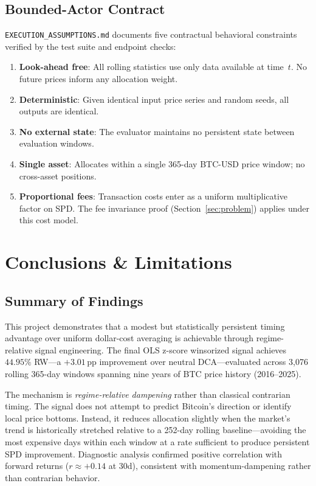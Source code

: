 \documentclass[11pt,letterpaper]{article}
\begin{document}
\subsection{Bounded-Actor Contract}

\texttt{EXECUTION\_ASSUMPTIONS.md} documents five contractual behavioral
constraints verified by the test suite and endpoint checks:

\begin{enumerate}
  \item \textbf{Look-ahead free}: All rolling statistics use only data
    available at time~$t$.  No future prices inform any allocation weight.
  \item \textbf{Deterministic}: Given identical input price series and random
    seeds, all outputs are identical.
  \item \textbf{No external state}: The evaluator maintains no persistent state
    between evaluation windows.
  \item \textbf{Single asset}: Allocates within a single 365-day BTC-USD price
    window; no cross-asset positions.
  \item \textbf{Proportional fees}: Transaction costs enter as a uniform
    multiplicative factor on SPD.  The fee invariance proof
    (Section~\ref{sec:problem}) applies under this cost model.
\end{enumerate}

\section{Conclusions \& Limitations}

\subsection{Summary of Findings}

This project demonstrates that a modest but statistically persistent timing
advantage over uniform dollar-cost averaging is achievable through regime-relative
signal engineering.  The final OLS z-score winsorized signal achieves
$\mathbf{44.95\%}$ RW---a $+3.01$\,pp improvement over neutral DCA---evaluated
across 3,076 rolling 365-day windows spanning nine years of BTC price history
(2016--2025).

The mechanism is \emph{regime-relative dampening} rather than classical
contrarian timing.  The signal does not attempt to predict Bitcoin's direction or
identify local price bottoms.  Instead, it reduces allocation slightly when the
market's trend is historically stretched relative to a 252-day rolling
baseline---avoiding the most expensive days within each window at a rate
sufficient to produce persistent SPD improvement.  Diagnostic analysis confirmed
positive correlation with forward returns ($r\approx +0.14$ at 30d), consistent
with momentum-dampening rather than contrarian behavior.
\end{document}
